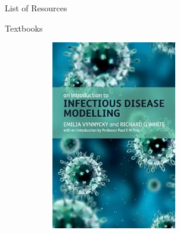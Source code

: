 \documentclass[
  ignorenonframetext,
]{beamer}
\begin{document}
\begin{frame}{List of Resources}
\begin{block}{Textbooks}
\begin{figure}
\begin{minipage}{0.50\linewidth}
\begin{figure}[H]
{\centering \includegraphics[width=0.6\textwidth,height=\textheight]{images/ID_modelling_Vynnycky_and_White.jpeg}

}


\end{figure}%

\end{minipage}%

\end{figure}%
\end{block}
\end{frame}
\end{document}
